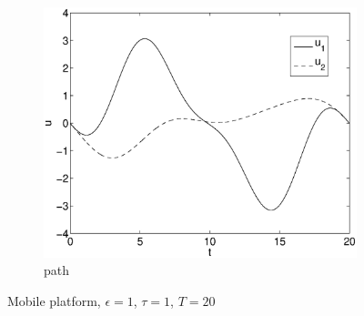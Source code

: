 \begin{figure}[h]
\begin{subfigure}[b]{\textwidth}
\centering
\includegraphics[height=0.3\textheight]{img/final_1_1_20_u.eps}
\caption{path}
\end{subfigure}
\caption{Mobile platform, $\epsilon=1$, $\tau=1$, $T=20$}
\label{fig:pl8}
\end{figure}

